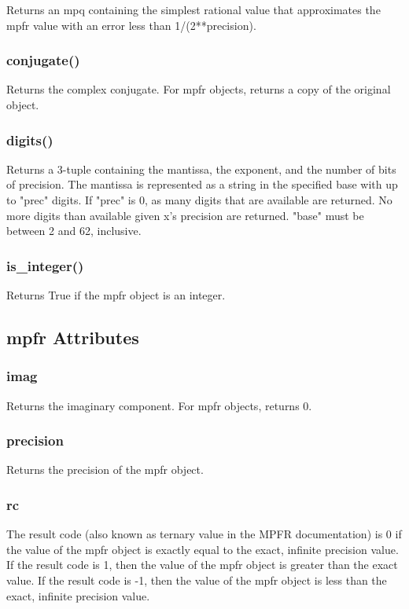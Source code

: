 Returns an mpq containing the simplest rational value that approximates the mpfr value with
an error less than 1/(2**precision).

\subsubsection{conjugate()}

Returns the complex conjugate. For mpfr objects, returns a copy of the original object.

\subsubsection{digits()}

Returns a 3-tuple containing the mantissa, the exponent, and the number of bits of precision.
The mantissa is represented as a string in the specified base with up to "prec" digits. If "prec" is
0, as many digits that are available are returned. No more digits than available given x's
precision are returned. "base" must be between 2 and 62, inclusive.

\subsubsection{is\_integer()}

Returns True if the mpfr object is an integer.




\subsection{mpfr Attributes}

\subsubsection{imag}

Returns the imaginary component. For mpfr objects, returns 0.

\subsubsection{precision}

Returns the precision of the mpfr object.

\subsubsection{rc}

The result code (also known as ternary value in the MPFR documentation) is 0 if the value of
the mpfr object is exactly equal to the exact, infinite precision value. If the result code is 1, then
the value of the mpfr object is greater than the exact value. If the result code is -1, then the
value of the mpfr object is less than the exact, infinite precision value.

